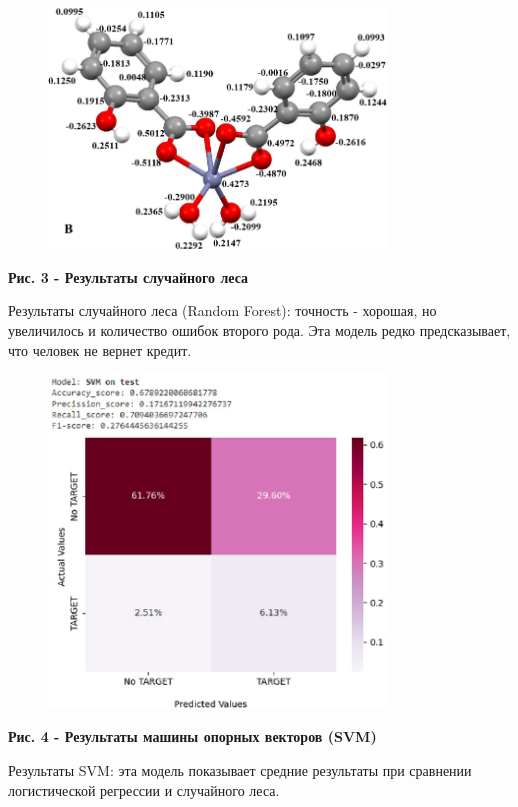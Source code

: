 \begin{figure}[H]
	\centering
	\includegraphics[width=0.8\textwidth]{assets/40}
	\caption*{}
\end{figure}

{\bfseries Рис. 3 - Результаты случайного леса}

Результаты случайного леса (Random Forest): точность - хорошая, но
увеличилось и количество ошибок второго рода. Эта модель редко
предсказывает, что человек не вернет кредит.

\begin{figure}[H]
	\centering
	\includegraphics[width=0.8\textwidth]{assets/41}
	\caption*{}
\end{figure}

{\bfseries Рис. 4 - Результаты машины опорных векторов (SVM)}

Результаты SVM: эта модель показывает средние результаты при сравнении
логистической регрессии и случайного леса.

